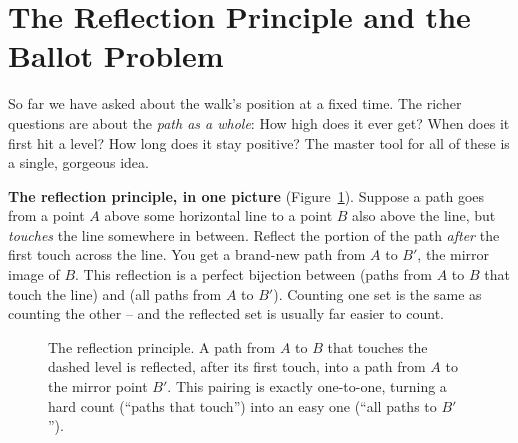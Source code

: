 \section{The Reflection Principle and the Ballot Problem}
\label{ch26:reflection}

So far we have asked about the walk's position at a fixed time. The richer
questions are about the \emph{path as a whole}: How high does it ever get? When
does it first hit a level? How long does it stay positive? The master tool for
all of these is a single, gorgeous idea.

\begin{intuitionbox}
\textbf{The reflection principle, in one picture}
(Figure~\ref{ch26:fig-reflection}). Suppose a path goes from a
point $A$ above some horizontal line to a point $B$ also above the line, but
\emph{touches} the line somewhere in between. Reflect the portion of the path
\emph{after} the first touch across the line. You get a brand-new path from $A$
to $B'$, the mirror image of $B$. This reflection is a perfect bijection
between (paths from $A$ to $B$ that touch the line) and (all paths from $A$ to
$B'$). Counting one set is the same as counting the other -- and the reflected
set is usually far easier to count.
\end{intuitionbox}

\begin{figure}[H]
\centering
{}
\caption{The reflection principle. A path from $A$ to $B$ that touches the
dashed level is reflected, after its first touch, into a path from $A$ to the
mirror point $B'$. This pairing is exactly one-to-one, turning a hard count
(``paths that touch'') into an easy one (``all paths to $B'$'').}
\label{ch26:fig-reflection}
\end{figure}


